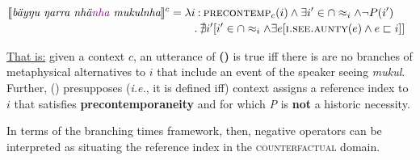 \a$\begin{multlined}\denote[c]{\textit{bäyŋu ŋarra nhä\textcolor{violet}{nha} mukulnha}}
=\lambda i\mathbin:\textsc{precontemp}_c(i)\wedge\exists i'\in\cap\approx_i\wedge\neg P(i')\\\mathbin.\nexists i'[i'\in\cap\approx_i\wedge\exists e[\textsc{i.see.aunty}(e)\wedge e\sqsubset i]]\end{multlined}$

\ul{That is:} given a context $ c $, an utterance of \textbf{()} is true iff there is are no branches of metaphysical alternatives to $ i $ that include an event of the speaker seeing \textit{mukul}.\\Further, () presupposes (\textit{i.e.}, it is defined iff) context assigns a reference index to $ i $ that satisfies \textbf{precontemporaneity} and for which \textit{P} is \textbf{not }a historic necessity.

\xe




In terms of the branching times framework, then, negative operators can be interpreted as situating the reference index in the \textsc{counterfactual} domain.


\begin{tikzpicture}
	
\end{tikzpicture}











